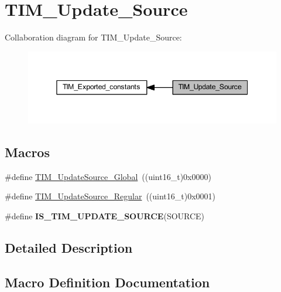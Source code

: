 \hypertarget{group___t_i_m___update___source}{}\section{T\+I\+M\+\_\+\+Update\+\_\+\+Source}
\label{group___t_i_m___update___source}
Collaboration diagram for T\+I\+M\+\_\+\+Update\+\_\+\+Source\+:\nopagebreak
\begin{figure}[H]
\begin{center}
\leavevmode
\includegraphics[width=345pt]{group___t_i_m___update___source}
\end{center}
\end{figure}
\subsection*{Macros}
\begin{DoxyCompactItemize}
\item 
\#define \hyperlink{group___t_i_m___update___source_ga32c67bc3f8211a2c7b44ee9fe1523875}{T\+I\+M\+\_\+\+Update\+Source\+\_\+\+Global}~((uint16\+\_\+t)0x0000)
\item 
\#define \hyperlink{group___t_i_m___update___source_ga6f50423cdb011137ae8cd303ccd2080c}{T\+I\+M\+\_\+\+Update\+Source\+\_\+\+Regular}~((uint16\+\_\+t)0x0001)
\item 
\#define {\bfseries I\+S\+\_\+\+T\+I\+M\+\_\+\+U\+P\+D\+A\+T\+E\+\_\+\+S\+O\+U\+R\+CE}(S\+O\+U\+R\+CE)
\end{DoxyCompactItemize}


\subsection{Detailed Description}


\subsection{Macro Definition Documentation}
\mbox{\label{group___t_i_m___update___source_ga7c916798d8f5f4a828afadceb5d38a95}} 
